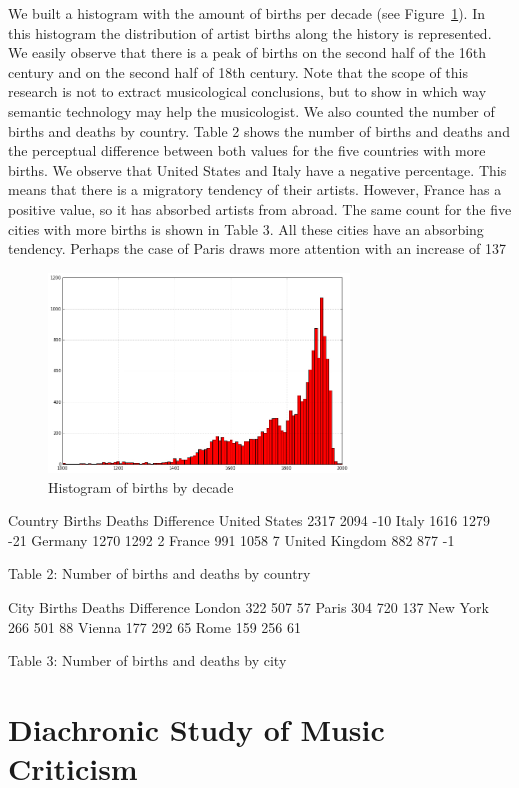 We built a histogram with the amount of births per decade (see Figure~\ref{fig:musicology:hist-births}). In this histogram the distribution of artist births along the history is represented. We easily observe that there is a peak of births on the second half of the 16th century and on the second half of 18th century. Note that the scope of this research is not to extract musicological conclusions, but to show in which way semantic technology may help the musicologist. 
We also counted the number of births and deaths by country. Table 2 shows the number of births and deaths and the perceptual difference between both values for the five countries with more births. We observe that United States and Italy have a negative percentage. This means that there is a migratory tendency of their artists. However, France has a positive value, so it has absorbed artists from abroad. The same count for the five cities with more births is shown in Table 3. All these cities have an absorbing tendency. Perhaps the case of Paris draws more attention with an increase of 137%

\begin{figure}[!ht]
	\centering
	\includegraphics[width=8cm]{ch05_musicology_pics/histogram-births.jpg}
	\caption{Histogram of births by decade
	\label{fig:musicology:hist-births}}
\end{figure}

Country	Births	Deaths	Difference
United States	2317	2094	-10%
Italy	1616	1279	-21%
Germany	1270	1292	2%
France	991	1058	7%
United Kingdom	882	877	-1%

Table 2: Number of births and deaths by country


City	Births	Deaths	Difference
London	322	507	57%
Paris	304	720	137%
New York	266	501	88%
Vienna	177	292	65%
Rome	159	256	61%

Table 3: Number of births and deaths by city



\section{Diachronic Study of Music Criticism}\label{sec:musicology:evolution}

